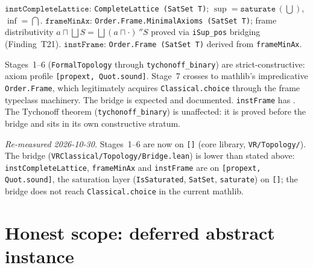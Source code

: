 \begin{definition}
\label{def:instFrame}
\leanok
{}
$\texttt{instCompleteLattice}$: \texttt{CompleteLattice (SatSet T)};
$\sup = \texttt{saturate}\,(\bigcup)$, $\inf = \bigcap$.
$\texttt{frameMinAx}$: \texttt{Order.Frame.MinimalAxioms (SatSet T)};
frame distributivity $a \sqcap \bigsqcup S = \bigsqcup (a \sqcap \cdot)\,''S$
proved via \texttt{iSup\_pos} bridging (Finding~T21).
$\texttt{instFrame}$: \texttt{Order.Frame (SatSet T)} derived from
\texttt{frameMinAx}.

\begin{remark}
\label{rem:topology_bridge}
\leanok
Stages~1--6 (\texttt{FormalTopology} through \texttt{tychonoff\_binary})
are strict-constructive: axiom profile \texttt{[propext, Quot.sound]}.
Stage~7 crosses to mathlib's impredicative \texttt{Order.Frame}, which
legitimately acquires \texttt{Classical.choice} through the frame
typeclass machinery.  The bridge is expected and documented.
\texttt{instFrame} has .
The Tychonoff theorem (\texttt{tychonoff\_binary}) is unaffected:
it is proved before the bridge and sits in its own constructive stratum.

\emph{Re-measured 2026-10-30.}  Stages~1--6 are now on \texttt{[]} (core library,
\texttt{VR/Topology/}).  The bridge (\texttt{VRClassical/Topology/Bridge.lean}) is lower
than stated above: \texttt{instCompleteLattice}, \texttt{frameMinAx} and
\texttt{instFrame} are on \texttt{[propext, Quot.sound]}, the saturation layer
(\texttt{IsSaturated}, \texttt{SatSet}, \texttt{saturate}) on \texttt{[]}; the bridge
does not reach \texttt{Classical.choice} in the current mathlib.
\end{remark}
\end{definition}

\section{Honest scope: deferred abstract instance}
\label{sec:topology_limitations}

